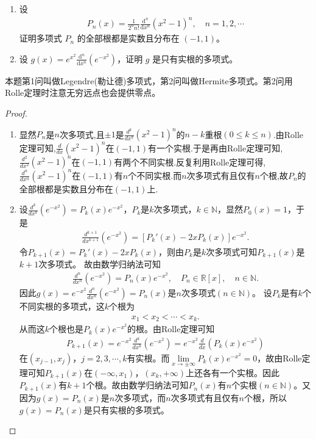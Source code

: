 \documentclass[../../main.tex]{subfiles}
\begin{document}
\begin{example}
\begin{enumerate}
\item 设
\begin{align}
P_n(x)=\frac{1}{2^n n!}\frac{\mathrm{d}^n}{\mathrm{d}x^n}(x^2 - 1)^n, \quad n = 1, 2, \cdots
\end{align}
证明多项式 \( P_n \) 的全部根都是实数且分布在 \( (-1, 1) \)。

\item 设 \( g(x)=e^{x^2}\frac{\mathrm{d}^n}{\mathrm{d}x^n}(e^{-x^2}) \)，证明 \( g \) 是只有实根的多项式。
\end{enumerate}
\end{example}
\begin{note}
本题第1问叫做Legendre(勒让德)多项式，第2问叫做Hermite多项式。第2问用Rolle定理时注意无穷远点也会提供零点。
\end{note}
\begin{proof}
\begin{enumerate}
\item 显然$P_n$是$n$次多项式,且$\pm 1$是$\frac{d^k}{dx^k}(x^2-1)^n$的$n-k$重根$(0\leqslant k\leqslant n)$.由Rolle定理可知,$\frac{d}{dx}(x^2-1)^n$在$(-1,1)$有一个实根.于是再由Rolle定理可知,$\frac{d^2}{dx^2}(x^2-1)^n$在$(-1,1)$有两个不同实根.反复利用Rolle定理可得,$\frac{d^n}{dx^n}(x^2-1)^n$在$(-1,1)$有$n$个不同实根.而$n$次多项式有且仅有$n$个根,故$P_n$的全部根都是实数且分布在$(-1,1)$上.

\item 设$\frac{d^k}{dx^k}(e^{-x^2}) = P_k(x)e^{-x^2}$，$P_k$是$k$次多项式，$k\in \mathbb{N}$，显然$P_0(x) = 1$，于是
\begin{align*}
\frac{d^{k+1}}{dx^{k+1}}(e^{-x^2}) = \left[ P_k'(x) - 2xP_k(x) \right] e^{-x^2}.
\end{align*}
令$P_{k+1}(x) = P_k'(x) - 2xP_k(x)$，则由$P_k$是$k$次多项式可知$P_{k+1}(x)$是$k+1$次多项式。
故由数学归纳法可知
\begin{align*}
\frac{d^n}{dx^n}(e^{-x^2}) = P_n(x)e^{-x^2}, \quad P_n \in \mathbb{R}[x], \quad n \in \mathbb{N}.
\end{align*}
因此$g(x) = e^{-x^2}\frac{d^n}{dx^n}(e^{-x^2}) = P_n(x)$是$n$次多项式$(n \in \mathbb{N})$。
设$P_k$是有$k$个不同实根的多项式，这$k$个根为
\begin{align*}
x_1 < x_2 < \cdots < x_k.
\end{align*}
从而这$k$个根也是$P_k(x)e^{-x^2}$的根。由Rolle定理可知
\begin{align*}
P_{k+1}(x) = e^{-x^2}\frac{d^k}{dx^k}(e^{-x^2}) = e^{-x^2}\frac{d}{dx}\left( P_k(x)e^{-x^2} \right)
\end{align*}
在$(x_{j-1}, x_j)$，$j=2,3,\cdots,k$有实根。而$\lim\limits_{x \rightarrow \pm \infty} P_k(x)e^{-x^2} = 0$，故由Rolle定理可知$P_{k+1}(x)$在$(-\infty, x_1)$，$(x_k, +\infty)$上还各有一个实根。因此$P_{k+1}(x)$有$k+1$个根。故由数学归纳法可知$P_n(x)$有$n$个实根$(n \in \mathbb{N})$。又因为$g(x) = P_n(x)$是$n$次多项式，而$n$次多项式有且仅有$n$个根，所以$g(x) = P_n(x)$是只有实根的多项式。
\end{enumerate}
\end{proof}
\end{document}

